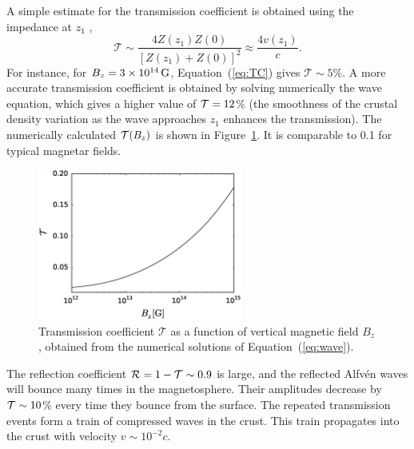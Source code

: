 A simple estimate for the transmission coefficient is obtained using the impedance at $z_1$ \citep{1989ApJ...343..839B},
\begin{equation}
\label{eq:TC}
   \mathcal{T}\sim \frac{4Z(z_1)Z(0)}{\left[Z(z_1)+Z(0)\right]^2} 
   \approx \frac{4v(z_1)}{c}. 
\end{equation}
For instance, for $B_z=3\times 10^{14}\,\rm G$, Equation~(\ref{eq:TC}) gives 
$\mathcal{T}\sim 5\%$. 
A more accurate transmission coefficient is obtained by solving numerically the wave equation, which gives a higher value of ${\mathcal T}=12$\% (the smoothness of the crustal density variation as the wave approaches $z_1$ 
enhances the transmission). 
The numerically calculated ${\mathcal T}(B_z)$ is shown in Figure~\ref{fig3}. It is comparable to 0.1 for typical magnetar fields.
\begin{figure}[h]
\centering
\includegraphics[width=0.6\textwidth]{pics/chap3/fig3.eps} 
\caption[Transmission coefficient $\mathcal{T}$ as a function of vertical magnetic 
field $B_z$]{Transmission coefficient $\mathcal{T}$ as a function of vertical magnetic 
field $B_z$, obtained from the numerical solutions of Equation~(\ref{eq:wave}).}
\label{fig3}
\end{figure}

The reflection coefficient ${\mathcal R}=1-{\mathcal T}\sim 0.9$ is large, and the reflected Alfv\'en waves will bounce many times in the magnetosphere. Their amplitudes decrease by ${\mathcal T}\sim 10$\% every time they bounce from the surface. 
The repeated transmission events form a train of compressed waves in the crust. 
This train propagates into the crust with velocity $v\sim 10^{-2}c$.

